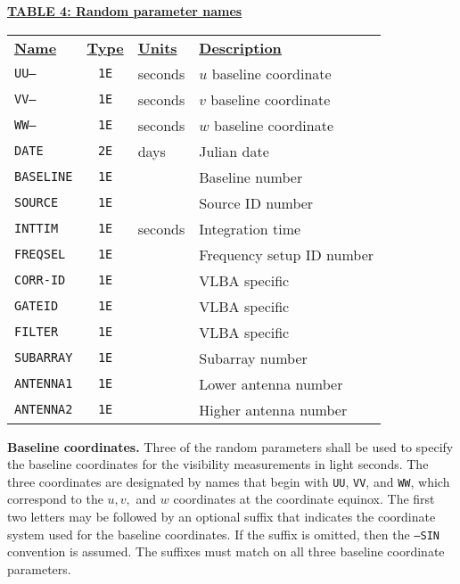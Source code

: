 \documentclass[twoside]{article}
\newcommand{\Hi}[1]{\textcolor{hicol}{#1}}
\begin{document}
\begin{center}
\underline{\bf{TABLE 4: Random parameter names}}\\
\begin{tabular}{lcll}
\noalign{\vspace{2pt}} \label{ta:randparms}
\underline{{\bf Name\vphantom{y}}} & \underline{\bf{Type}} &
   \underline{{\bf Units\vphantom{y}}} & \underline{\bf{Description}} \\
\noalign{\vspace{2pt}}
{\tt UU--}      & {\tt 1E} & seconds & $u$ baseline coordinate \\
{\tt VV--}      & {\tt 1E} & seconds & $v$ baseline coordinate \\
{\tt WW--}      & {\tt 1E} & seconds & $w$ baseline coordinate \\
{\tt DATE}      & {\tt 2E} & days    & Julian date \\
{\tt BASELINE}  & {\tt 1E} &         & Baseline number \\
{\tt SOURCE}    & {\tt 1E} &         & Source ID number \\
{\tt INTTIM}    & {\tt 1E} & seconds & Integration time \\
{\tt FREQSEL}   & {\tt 1E} &         & Frequency setup ID number \\
{\tt CORR-ID}   & {\tt 1E} &         & VLBA specific \\
{\tt GATEID}    & {\tt 1E} &         & VLBA specific \\
{\tt FILTER}    & {\tt 1E} &         & VLBA specific \\
{\tt \Hi{SUBARRAY}} & {\tt \Hi{\tt 1E}} & & \Hi{Subarray number} \\
{\tt \Hi{ANTENNA1}} & {\tt \Hi{\tt 1E}} & & \Hi{Lower antenna number} \\
{\tt \Hi{ANTENNA2}} & {\tt \Hi{\tt 1E}} & & \Hi{Higher antenna number}
\end{tabular}
\end{center}

{\bf Baseline coordinates.}  Three of the random parameters shall be
used to specify the baseline coordinates for the visibility
measurements in light seconds.  The three coordinates are designated
by names that begin with {\tt UU}, {\tt VV}, and {\tt WW}, which
correspond to the $u, v,$ and $w$ coordinates at the coordinate
equinox.  The first two letters may be followed by an optional suffix
that indicates the coordinate system used for the baseline
coordinates.  If the suffix is omitted, then the {\tt ---SIN}
convention is assumed.  The suffixes must match on all three baseline
coordinate parameters.
\end{document}
